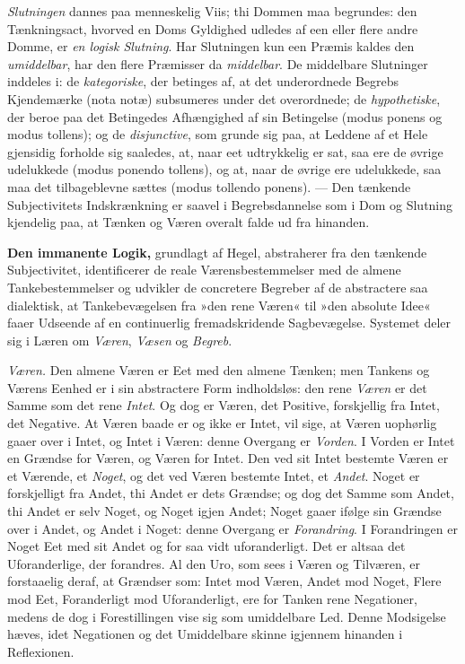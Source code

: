 \documentclass[12pt]{book}
\newcommand{\apage}[1]{\marginnote{\footnotesize\textit{[#1]}}}
\begin{document}
\emph{Slutningen} dannes paa menneskelig Viis; thi Dommen maa begrundes: den
Tænkningsact, hvorved en Doms Gyldighed udledes af een eller flere andre
Domme, er \emph{en logisk Slutning}. Har Slutningen kun een Præmis kaldes den
\emph{umiddelbar}, har den flere Præmisser da \emph{middelbar}. De middelbare Slutninger
inddeles i: de \emph{kategoriske}, der betinges af, at det underordnede Begrebs
Kjendemærke (nota notæ) subsumeres under det overordnede; de
\emph{hypothetiske}, der beroe paa det Betingedes Afhængighed af sin Betingelse
(modus ponens og modus tollens); og de \emph{disjunctive}, som
grunde sig paa, at Leddene af et Hele gjensidig forholde sig saaledes, at,
naar eet udtrykkelig er sat, saa ere de øvrige udelukkede (modus
ponendo tollens), og at, naar de øvrige ere udelukkede, saa maa det
tilbageblevne sættes (modus tollendo ponens).  \apage{101} --- Den tænkende Subjectivitets Indskrænkning er saavel i Begrebsdannelse som i Dom og
Slutning kjendelig paa, at Tænken og Væren overalt falde ud fra hinanden.

\textbf{Den immanente Logik,} grundlagt af Hegel, abstraherer fra den tænkende
Subjectivitet, identificerer de reale Værensbestemmelser med de almene
Tankebestemmelser og udvikler de concretere Begreber af de abstractere saa
dialektisk, at Tankebevægelsen fra »den rene Væren« til »den absolute
Idee« faaer Udseende af en continuerlig fremadskridende Sagbevægelse.
Systemet deler sig i Læren om \emph{Væren}, \emph{Væsen} og \emph{Begreb}.

\emph{Væren.} Den almene Væren er Eet med den almene Tænken; men Tankens og
Værens Eenhed er i sin abstractere Form indholdsløs: den rene \emph{Væren} er det
Samme som det rene \emph{Intet}. Og dog er Væren, det Positive, forskjellig fra
Intet, det Negative. At Væren baade er og ikke er Intet, vil sige, at Væren
uophørlig gaaer over i Intet, og Intet i Væren: denne Overgang er \emph{Vorden}. I
Vorden er Intet en Grændse for Væren, og Væren for Intet. Den ved sit Intet
bestemte Væren er et Værende, et \emph{Noget}, og det ved Væren bestemte Intet, et
\emph{Andet}. Noget er forskjelligt fra Andet, thi Andet er dets Grændse; og dog
det Samme som Andet, thi Andet er selv Noget, og Noget igjen Andet; Noget
gaaer ifølge sin Grændse over i Andet, og Andet i Noget: denne Overgang er
\emph{Forandring}. I Forandringen er Noget Eet med sit Andet og for saa vidt
uforanderligt. Det er altsaa det Uforanderlige, der forandres. Al den Uro,
som sees \apage{102} i Væren og Tilværen, er forstaaelig deraf, at Grændser som: Intet
mod Væren, Andet mod Noget, Flere mod Eet, Foranderligt mod Uforanderligt,
ere for Tanken rene Negationer, medens de dog i Forestillingen vise sig som
umiddelbare Led. Denne Modsigelse hæves, idet Negationen og det Umiddelbare
skinne igjennem hinanden i Reflexionen.
\end{document}
